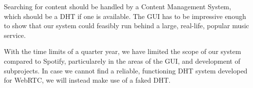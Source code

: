 Searching for content should be handled by a Content Management System,
which should be a \acs{DHT} if one is available.
The \acs{GUI} has to be impressive enough to show that our system
could feasibly run behind a large, real-life, popular music service.

With the time limits of a quarter year,
we have limited the scope of our system compared to Spotify,
particularely in the areas of the \acs{GUI}, and development of subprojects.
In case we cannot find a reliable, functioning \acs{DHT} system developed for WebRTC,
we will instead make use of a faked \acs{DHT}.
